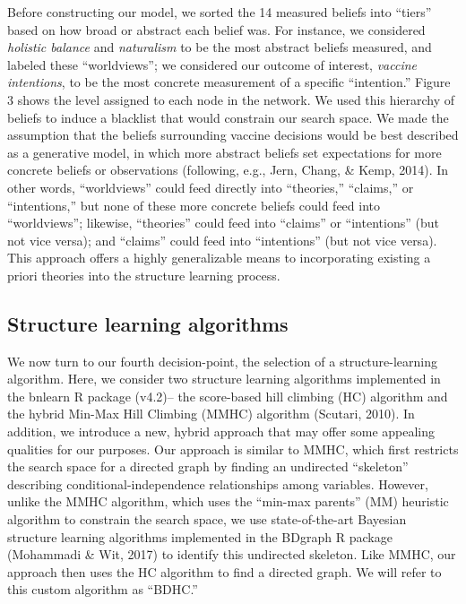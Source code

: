 \documentclass[10pt, letterpaper]{article}
\begin{document}
Before constructing our model, we sorted the 14 measured beliefs into
``tiers'' based on how broad or abstract each belief was. For instance,
we considered \emph{holistic balance} and \emph{naturalism} to be the
most abstract beliefs measured, and labeled these ``worldviews''; we
considered our outcome of interest, \emph{vaccine intentions}, to be the
most concrete measurement of a specific ``intention.'' Figure 3 shows
the level assigned to each node in the network. We used this hierarchy
of beliefs to induce a blacklist that would constrain our search space.
We made the assumption that the beliefs surrounding vaccine decisions
would be best described as a generative model, in which more abstract
beliefs set expectations for more concrete beliefs or observations
(following, e.g., Jern, Chang, \& Kemp, 2014). In other words,
``worldviews'' could feed directly into ``theories,'' ``claims,'' or
``intentions,'' but none of these more concrete beliefs could feed into
``worldviews''; likewise, ``theories'' could feed into ``claims'' or
``intentions'' (but not vice versa); and ``claims'' could feed into
``intentions'' (but not vice versa). This approach offers a highly
generalizable means to incorporating existing a priori theories into the
structure learning process.

\subsection{Structure learning
algorithms}\label{structure-learning-algorithms}

We now turn to our fourth decision-point, the selection of a
structure-learning algorithm. Here, we consider two structure learning
algorithms implemented in the bnlearn R package (v4.2)-- the score-based
hill climbing (HC) algorithm and the hybrid Min-Max Hill Climbing (MMHC)
algorithm (Scutari, 2010). In addition, we introduce a new, hybrid
approach that may offer some appealing qualities for our purposes. Our
approach is similar to MMHC, which first restricts the search space for
a directed graph by finding an undirected ``skeleton'' describing
conditional-independence relationships among variables. However, unlike
the MMHC algorithm, which uses the ``min-max parents'' (MM) heuristic
algorithm to constrain the search space, we use state-of-the-art
Bayesian structure learning algorithms implemented in the BDgraph R
package (Mohammadi \& Wit, 2017) to identify this undirected skeleton.
Like MMHC, our approach then uses the HC algorithm to find a directed
graph. We will refer to this custom algorithm as ``BDHC.''
\end{document}
